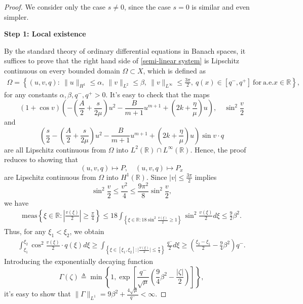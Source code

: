 \documentclass[10pt]{article}
\numberwithin{equation}{section}
\begin{document}
	\begin{proof}
		We consider only the case $s\neq0$, since the case $s=0$ is similar and even simpler.
		
		\textbf{Step 1: Local existence}
		
		By the standard theory of ordinary differential equations in Banach spaces, it suffices to prove that the right hand side of \eqref{semi-linear system} is Lipschitz continuous on every bounded domain $\Omega\subset X$, which is defined as
		\begin{align*}
			\Omega=\left\{(u,v,q):\ \|u\|_{H^{1}}\leq\alpha,\ \|v\|_{L^{2}}\leq\beta,\ \|v\|_{L^{\infty}}\leq\frac{3\pi}{2},\ q(x)\in[q^{-},q^{+}]\ \mathrm{for\ a.e.}x\in \mathbb{R}\right\},
		\end{align*}
		for any constants $\alpha,\beta,q^-,q^+>0$. It's easy to check that the maps
		$$(1+\cos v)\left(-\left(\frac A2+\frac{s}{2\mu}\right)u^2-\frac{B}{m+1}u^{m+1}+\left(2k+\frac{\eta}{\mu}\right)u\right),\quad\sin^2\frac{v}{2}$$
		and 
		$$\left(\frac{s}{2}-\left(\frac A2+\frac{s}{2\mu}\right)u^2-\frac{B}{m+1}u^{m+1}+\left(2k+\frac{\eta}{\mu}\right)u\right)\sin v\cdot q$$
		are all Lipschitz continuous from $\Omega$ into $L^2(\mathbb{R})\cap L^\infty(\mathbb{R})$. Hence, the proof reduces to showing that 
		\begin{equation}\label{maps_P_Px}
			(u,v,q)\mapsto P,\quad(u,v,q)\mapsto P_x
		\end{equation}
		are Lipschitz continuous from $\Omega$ into $H^1(\mathbb{R})$. Since $|v|\leq\frac{3\pi}{2}$ implies 
		$$\sin^2\frac{v}{2}\leq\frac{v^2}{4}\leq\frac{9\pi^2}{8}\sin^2\frac{v}{2},$$
		we have
		\begin{align*}
			\mathrm{meas}\left\{\xi\in\mathbb{R}:\left|\frac{v(\xi)}{2}\right|\geq\frac{\pi}{4}\right\}
			\leq18\int_{\left\{\xi\in\mathbb{R}:18\sin^{2}\frac{v(\xi)}{2}\geq1\right\}}\sin^{2}\frac{v(\xi)}{2}d\xi\leq\frac{9}{2}\beta^{2}.
		\end{align*}
		Thus, for any $\xi_1<\xi_2$, we obtain
		\begin{align*}
			\int_{\xi_{1}}^{\xi_{2}}\cos^{2}\frac{v(\xi)}{2}\cdot q(\xi)d\xi \geq\int_{\left\{\xi\in[\xi_{1},\xi_{2}]:\mid\frac{v(\xi)}{2}\mid\leq\frac{\pi}{4}\right\}}\frac{q^{-}}{2}d\xi \geq\left(\frac{\xi_{2}-\xi_{1}}{2}-\frac{9}{4}\beta^{2}\right)q^{-}. 
		\end{align*}
		Introducing the exponentially decaying function
		\begin{equation*}
			\Gamma(\zeta)\triangleq\min\left\{1,\exp\left[\frac{q^-}{\sqrt{\mu}}\left(\frac{9}{4}\beta^2-\frac{|\zeta|}{2}\right)\right]\right\},
		\end{equation*}
		it's easy to show that $\|\Gamma\|_{L^1}=9\beta^2+\frac{4\sqrt{\mu}}{q^-}<\infty$. 
		

\end{proof}
\end{document}
